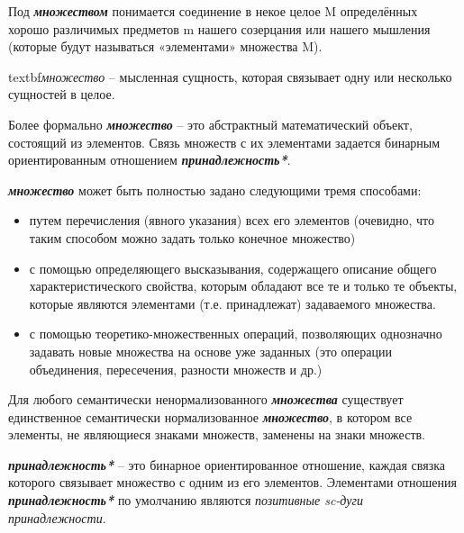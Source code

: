 Под \textbf{\textit{множеством}} понимается соединение в некое целое M определённых хорошо различимых предметов m нашего созерцания или нашего мышления (которые будут называться «элементами» множества M). 
	
textbf{\textit{множество}} – мысленная сущность, которая связывает одну или несколько сущностей в целое.
	
Более формально \textbf{\textit{множество}} – это абстрактный математический объект, состоящий из элементов. Связь множеств с их элементами задается бинарным ориентированным отношением \textbf{\textit{принадлежность*}}.

\textbf{\textit{множество}} может быть полностью задано следующими тремя способами:
\begin{itemize}
		\item путем перечисления (явного указания) всех его элементов (очевидно, что таким способом можно задать только конечное множество)
		\item с помощью определяющего высказывания, содержащего описание общего характеристического свойства, которым обладают все те и только те объекты, которые являются элементами (т.е. принадлежат) задаваемого множества.
		\item с помощью теоретико-множественных операций, позволяющих однозначно задавать новые множества на основе уже заданных (это операции объединения, пересечения, разности множеств и др.)
\end{itemize}
Для любого семантически ненормализованного \textbf{\textit{множества}} существует единственное семантически нормализованное \textbf{\textit{множество}}, в котором все элементы, не являющиеся знаками множеств, заменены на знаки множеств.

\begin{SCn}
\end{SCn}


\textbf{\textit{принадлежность*}} – это бинарное ориентированное отношение, каждая связка которого связывает множество с одним из его элементов. Элементами отношения \textbf{\textit{принадлежность*}} по умолчанию являются \textit{позитивные sc-дуги принадлежности}.

\begin{SCn}
\end{SCn}

